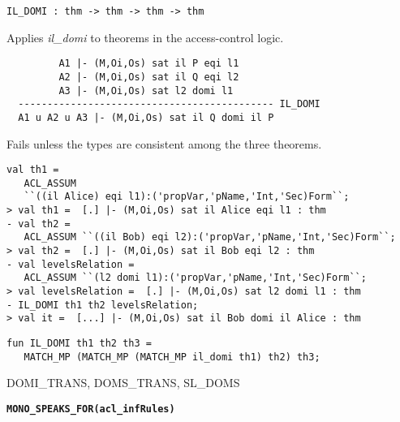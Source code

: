 \begin{verbatim}
IL_DOMI : thm -> thm -> thm -> thm
\end{verbatim}

\SYNOPSIS
Applies \emph{il\_domi} to theorems in the access-control logic.

\DESCRIBE

\begin{verbatim}
         A1 |- (M,Oi,Os) sat il P eqi l1
         A2 |- (M,Oi,Os) sat il Q eqi l2  
         A3 |- (M,Oi,Os) sat l2 domi l1
  -------------------------------------------- IL_DOMI
  A1 u A2 u A3 |- (M,Oi,Os) sat il Q domi il P
\end{verbatim}

\FAILURE
Fails unless the types are consistent among the three
theorems.

\EXAMPLE
\begin{holboxed}
\begin{verbatim}
val th1 = 
   ACL_ASSUM 
   ``((il Alice) eqi l1):('propVar,'pName,'Int,'Sec)Form``;
> val th1 =  [.] |- (M,Oi,Os) sat il Alice eqi l1 : thm
- val th2 = 
   ACL_ASSUM ``((il Bob) eqi l2):('propVar,'pName,'Int,'Sec)Form``;
> val th2 =  [.] |- (M,Oi,Os) sat il Bob eqi l2 : thm
- val levelsRelation = 
   ACL_ASSUM ``(l2 domi l1):('propVar,'pName,'Int,'Sec)Form``;
> val levelsRelation =  [.] |- (M,Oi,Os) sat l2 domi l1 : thm
- IL_DOMI th1 th2 levelsRelation;
> val it =  [...] |- (M,Oi,Os) sat il Bob domi il Alice : thm
\end{verbatim}
\end{holboxed}

\IMPLEMENTATION
\begin{holboxed}
\begin{verbatim}
fun IL_DOMI th1 th2 th3 =
   MATCH_MP (MATCH_MP (MATCH_MP il_domi th1) th2) th3;
\end{verbatim}
\end{holboxed}

\SEEALSO
DOMI\_TRANS, DOMS\_TRANS, SL\_DOMS
\ENDDOC

\begin{holboxed}
  \begin{Large}
    \textbf{\texttt{MONO\_SPEAKS\_FOR}}\hfill{}\textbf{\texttt{(acl\_infRules)}}
  \end{Large}
\end{holboxed}

